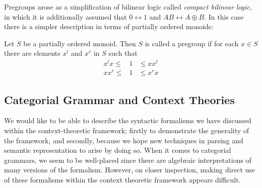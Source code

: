 Pregroups \citep{Lambek:01} arose as a simplification of bilinear logic called \emph{compact bilinear logic}, in which it is additionally assumed that $0 \leftrightarrow 1$ and $AB \leftrightarrow A\oplus B$. In this case there is a simpler description in terms of partially ordered monoids:

\begin{defn}[Pregroup]
Let $S$ be a partially ordered monoid. Then $S$ is called a pregroup if for each $x\in S$ there are elements $x^l$ and $x^r$ in $S$ such that
\begin{eqnarray*}
x^lx \le &1& \le xx^l\\
xx^r \le &1& \le x^rx
\end{eqnarray*}
\end{defn}





\subsection{Categorial Grammar and Context Theories}
\label{categorial-context}


We would like to be able to describe the syntactic formalisms we have discussed within the context-theoretic framework; firstly to demonstrate the generality of the framework, and secondly, because we hope new techniques in parsing and semantic representation to arise by doing so. When it comes to categorial grammars, we seem to be well-placed since there are algebraic interpretations of many versions of the formalism. However, on closer inspection, making direct use of these formalisms within the context theoretic framework appears difficult.

